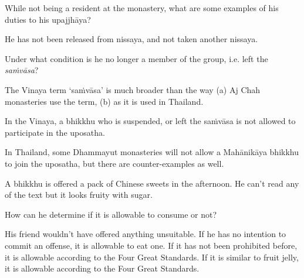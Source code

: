 \begin{exam}{\autoExamName}
\begin{problem*}
\begin{parts}
    \item While not being a resident at the monastery, what are some examples of his duties to his upajjhāya?

    \begin{solution}
      He has not been released from nissaya, and not taken another nissaya.
    \end{solution}

    \bigskip

    \fillin{12cm}{}

    \item Under what condition is he no longer a member of the group, i.e. left the \emph{saṁvāsa}?

    \begin{solution}
      The Vinaya term `saṁvāsa' is much broader than the way (a) Aj Chah monasteries use the term, (b) as it is used in Thailand.

      In the Vinaya, a bhikkhu who is suspended, or left the saṁvāsa is not allowed to participate in the uposatha.

      In Thailand, some Dhammayut monasteries will not allow a Mahānikāya bhikkhu to join the uposatha, but there are counter-examples as well.
    \end{solution}

    \bigskip

    \fillin{12cm}{}

  \end{parts}

\end{problem*}

\ifnosolutions
\clearpage
\else
\problemDivide
\fi

\begin{problem*}

  A bhikkhu is offered a pack of Chinese sweets in the afternoon. He can't read any of the text but it looks fruity with sugar.

  \bigskip

  \begin{parts}

    \item How can he determine if it is allowable to consume or not?

    \bigskip

    \begin{answers}{1}
      \bChoices
       His friend wouldn't have offered anything unsuitable. \eAns
       If he has no intention to commit an offense, it is allowable to eat one. \eAns
       If it has not been prohibited before, it is allowable according to the Four Great Standards. \eAns
       If it is similar to fruit jelly, it is allowable according to the Four Great Standards. \eAns
      \eChoices
    \end{answers}


\end{parts}
\end{problem*}
\end{exam}
